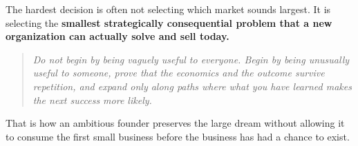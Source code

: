 The hardest decision is often not selecting which market sounds largest. It is selecting the \textbf{smallest strategically consequential problem that a new organization can actually solve and sell today.}

\begin{quote}
\emph{Do not begin by being vaguely useful to everyone. Begin by being unusually useful to someone, prove that the economics and the outcome survive repetition, and expand only along paths where what you have learned makes the next success more likely.}
\end{quote}

That is how an ambitious founder preserves the large dream without allowing it to consume the first small business before the business has had a chance to exist.
